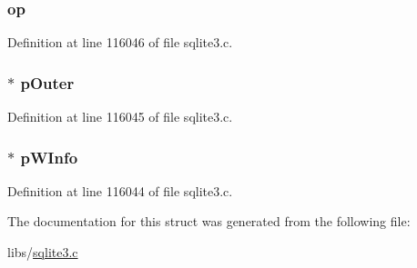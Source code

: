 \subsubsection[{op}]{ op}\label{struct_where_clause_a0991b29aa40e12f033237266ebe6610c}


Definition at line 116046 of file sqlite3.\+c.

\hypertarget{struct_where_clause_aea52862df26541b76c03c923ea2b6ed7}{}
\subsubsection[{p\+Outer}]{$\ast$ p\+Outer}\label{struct_where_clause_aea52862df26541b76c03c923ea2b6ed7}


Definition at line 116045 of file sqlite3.\+c.

\hypertarget{struct_where_clause_a831ff4750d43c35052a460caacac1bac}{}
\subsubsection[{p\+W\+Info}]{$\ast$ p\+W\+Info}\label{struct_where_clause_a831ff4750d43c35052a460caacac1bac}


Definition at line 116044 of file sqlite3.\+c.



The documentation for this struct was generated from the following file\+:\begin{DoxyCompactItemize}
\item 
libs/\hyperlink{sqlite3_8c}{sqlite3.\+c}\end{DoxyCompactItemize}
